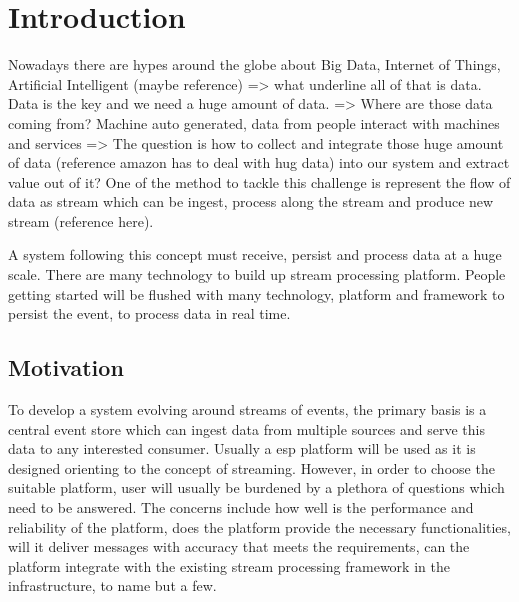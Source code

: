 \chapter{Introduction} \label{chap:intro}
Nowadays there are hypes around the globe about Big Data, Internet of Things, Artificial Intelligent (maybe reference) => what underline all of that is data. Data is the key and we need a huge amount of data. => Where are those data coming from? Machine auto generated, data from people interact with machines and services => The question is how to collect and integrate those huge amount of data (reference amazon has to deal with hug data) into our system and extract value out of it? One of the method to tackle this challenge is represent the flow of data as stream which can be ingest, process along the stream and produce new stream (reference here). 

A system following this concept must receive, persist and process data at a huge scale.  There are many technology to build up stream processing platform. People getting started will be flushed with many technology, platform and framework to persist the event, to process data in real time. 
\section{Motivation}
To develop a system evolving around streams of events, the primary basis is a central event store which can ingest data from multiple sources and serve this data to any interested consumer. Usually a \acrlong{esp} platform will be used as it is designed orienting to the concept of streaming. However, in order to choose the suitable platform, user will usually be burdened by a plethora of questions which need to be answered. The concerns include how well is the performance and reliability of the platform, does the platform provide the necessary functionalities, will it deliver messages with accuracy that meets the requirements, can the platform integrate with the existing stream processing framework in the infrastructure, to name but a few.

